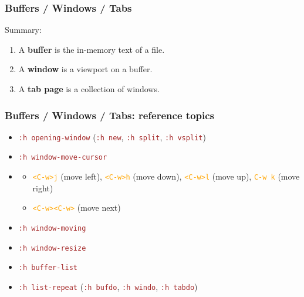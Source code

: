 \documentclass{beamer}
\newcommand{\vimnormal}[1]{\texttt{\textcolor{orange}{#1}}}
\newcommand{\vimcommand}[1]{\texttt{\textcolor{brown}{#1}}}
\newcommand{\vimhelp}[1]{\vimcommand{:h #1}}
\newcommand{\vimkey}[1]{\textless{}#1\textgreater{}}
\begin{document}
\begin{frame}
    \frametitle{Buffers / Windows / Tabs}
    Summary:
    \begin{enumerate}
        \item A \textbf{buffer} is the in-memory text of a file.
        \item A \textbf{window} is a viewport on a buffer.
        \item A \textbf{tab page} is a collection of windows.
    \end{enumerate}
\end{frame}

\begin{frame}
    \frametitle{Buffers / Windows / Tabs: reference topics}
    \begin{itemize} 
        \item \vimhelp{opening-window} (\vimhelp{new}, \vimhelp{split}, \vimhelp{vsplit}) \\
        \item \vimhelp{window-move-cursor} \\
        \item
        \begin{itemize}
            \item \vimnormal{\vimkey{C-w}j} (move left), \vimnormal{\vimkey{C-w}h} (move down), \vimnormal{\vimkey{C-w}l} (move up), \vimnormal{C-w k} (move right)
            \item \vimnormal{\vimkey{C-w}\vimkey{C-w}} (move next)
        \end{itemize}
        \item \vimhelp{window-moving} 
        \item \vimhelp{window-resize}
        \item \vimhelp{buffer-list} 
        \item \vimhelp{list-repeat} (\vimhelp{bufdo}, \vimhelp{windo}, \vimhelp{tabdo})
    \end{itemize}
\end{frame}
\end{document}
